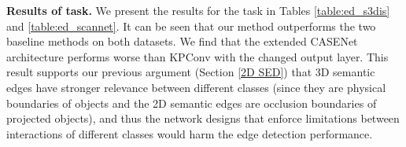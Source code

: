 \documentclass[runningheads]{llncs}
\begin{document}
\begin{table}
\begin{center}
\caption{MF (ODS) scores (\%) {of semantic edge detection} on S3DIS Area-5.}
\label{table:ed_s3dis}
\end{center}
\end{table}


\smallskip \noindent \textbf{Results of {\SemEdgeD} task.}
We present the results for the {\SemEdgeD} task in Tables \ref{table:ed_s3dis} and \ref{table:ed_scannet}. It can be seen that our method outperforms the two baseline
methods on both datasets. We find that the extended CASENet architecture performs worse than KPConv with the changed output layer. This result supports our previous argument (Section \ref{2D SED}) that 3D semantic edges have stronger relevance between different classes (since they are physical boundaries of objects and the 2D semantic edges are occlusion boundaries of projected objects), {and} thus {the} network designs that enforce limitations between interactions of different classes would harm the edge detection performance. 
\end{document}
